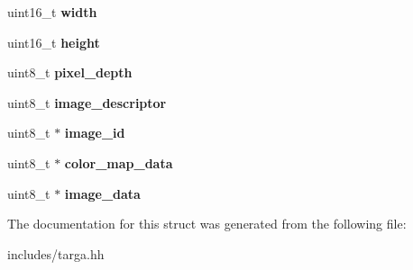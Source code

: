 \begin{DoxyCompactItemize}
\item 
\hypertarget{structtga__image_acf9bd19c10794f18f60a001faef58111}{uint16\-\_\-t {\bfseries width}}\label{structtga__image_acf9bd19c10794f18f60a001faef58111}

\item 
\hypertarget{structtga__image_a4dc0ebbfcac989925ee7644ca3e28eab}{uint16\-\_\-t {\bfseries height}}\label{structtga__image_a4dc0ebbfcac989925ee7644ca3e28eab}

\item 
\hypertarget{structtga__image_ae3e4a7107ebf7f4149f3522a0e7526e5}{uint8\-\_\-t {\bfseries pixel\-\_\-depth}}\label{structtga__image_ae3e4a7107ebf7f4149f3522a0e7526e5}

\item 
\hypertarget{structtga__image_ac99db40eff2f958594a5484185bdd59e}{uint8\-\_\-t {\bfseries image\-\_\-descriptor}}\label{structtga__image_ac99db40eff2f958594a5484185bdd59e}

\item 
\hypertarget{structtga__image_a16f8b6f04c767463f88701cced228d3d}{uint8\-\_\-t $\ast$ {\bfseries image\-\_\-id}}\label{structtga__image_a16f8b6f04c767463f88701cced228d3d}

\item 
\hypertarget{structtga__image_ae0c92f5d861e12f9ba3cbbe1e730f13d}{uint8\-\_\-t $\ast$ {\bfseries color\-\_\-map\-\_\-data}}\label{structtga__image_ae0c92f5d861e12f9ba3cbbe1e730f13d}

\item 
\hypertarget{structtga__image_a4d1ce9142f635f07d106d35364af89f0}{uint8\-\_\-t $\ast$ {\bfseries image\-\_\-data}}\label{structtga__image_a4d1ce9142f635f07d106d35364af89f0}

\end{DoxyCompactItemize}


The documentation for this struct was generated from the following file\-:\begin{DoxyCompactItemize}
\item 
includes/targa.\-hh\end{DoxyCompactItemize}

